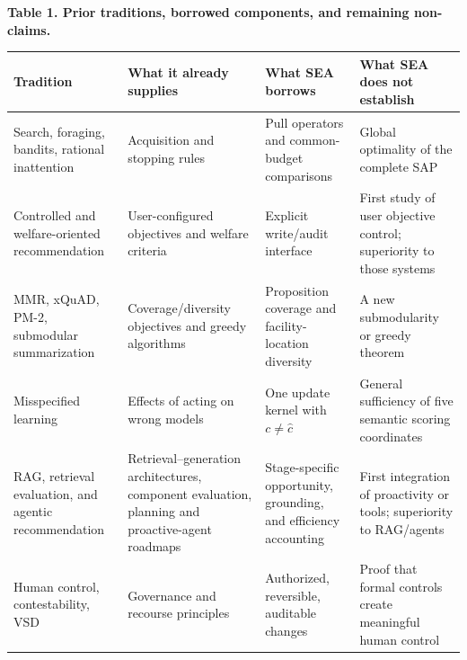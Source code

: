 \documentclass[
  11pt]{article}
\begin{document}
\textbf{Table 1. Prior traditions, borrowed components, and remaining
non-claims.}

\begin{longtable}[]{@{}
  >{\raggedright\arraybackslash}p{}
  >{\raggedright\arraybackslash}p{}
  >{\raggedright\arraybackslash}p{}
  >{\raggedright\arraybackslash}p{}@{}}
\toprule\noalign{}
\begin{minipage}[b]{\linewidth}\raggedright
Tradition
\end{minipage} & \begin{minipage}[b]{\linewidth}\raggedright
What it already supplies
\end{minipage} & \begin{minipage}[b]{\linewidth}\raggedright
What SEA borrows
\end{minipage} & \begin{minipage}[b]{\linewidth}\raggedright
What SEA does not establish
\end{minipage} \\
\midrule\noalign{}
\endhead
\bottomrule\noalign{}
\endlastfoot
Search, foraging, bandits, rational inattention & Acquisition and
stopping rules & Pull operators and common-budget comparisons & Global
optimality of the complete SAP \\
Controlled and welfare-oriented recommendation & User-configured
objectives and welfare criteria & Explicit write/audit interface & First
study of user objective control; superiority to those systems \\
MMR, xQuAD, PM-2, submodular summarization & Coverage/diversity
objectives and greedy algorithms & Proposition coverage and
facility-location diversity & A new submodularity or greedy theorem \\
Misspecified learning & Effects of acting on wrong models & One update
kernel with \(c\ne\hat c\) & General sufficiency of five semantic
scoring coordinates \\
RAG, retrieval evaluation, and agentic recommendation &
Retrieval--generation architectures, component evaluation, planning and
proactive-agent roadmaps & Stage-specific opportunity, grounding, and
efficiency accounting & First integration of proactivity or tools;
superiority to RAG/agents \\
Human control, contestability, VSD & Governance and recourse principles
& Authorized, reversible, auditable changes & Proof that formal controls
create meaningful human control \\
\end{longtable}
\end{document}

